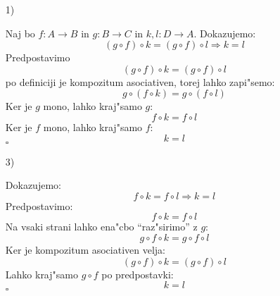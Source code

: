 \begin{enumerate}
	\item[1)] 
	
	Naj bo $f: A \to B$ in $g: B \to C$ in $k, l: D \to A$. Dokazujemo:
	\begin{equation*}
	(g \circ f) \circ k = (g \circ f) \circ l \Rightarrow k = l
	\end{equation*}
	Predpostavimo
	\begin{equation*}
	(g \circ f) \circ k = (g \circ f) \circ l
	\end{equation*}
	po definiciji je kompozitum asociativen, torej lahko zapi"semo:
	\begin{equation*}
	g \circ (f \circ k) =g \circ (f \circ l)
	\end{equation*}
	Ker je $g$ mono, lahko kraj"samo $g$:
	\begin{equation*}
	f \circ k = f \circ l
	\end{equation*}
	Ker je $f$ mono, lahko kraj"samo $f$:
	\begin{equation*}
	k = l
	\end{equation*}
	\hfill $\square$
	
	\item[3)] 
	
	Dokazujemo:
	\begin{equation*}
		f \circ k = f \circ l \Rightarrow k = l
	\end{equation*}
	Predpostavimo:
	\begin{equation*}
	f \circ k = f \circ l
	\end{equation*}
	Na vsaki strani lahko ena"cbo ``raz"sirimo'' z $g$:
	\begin{equation*}
	g \circ f \circ k = g \circ f \circ l
	\end{equation*}
	Ker je kompozitum asociativen velja:
	\begin{equation*}
	(g \circ f) \circ k = (g \circ f) \circ l
	\end{equation*}
	Lahko kraj"samo $g \circ f$ po predpostavki:
	\begin{equation*}
	k = l
	\end{equation*}
	\hfill $\square$
\end{enumerate}

